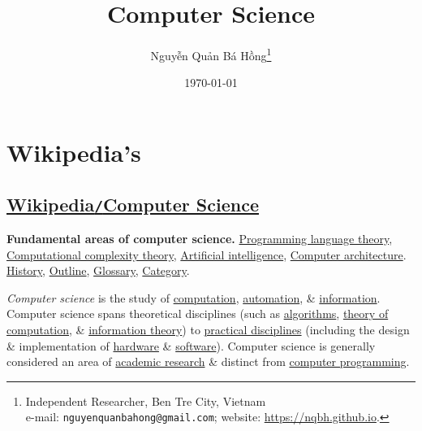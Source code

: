 \documentclass[oneside]{book}
\title{Computer Science}
\author{\selectlanguage{vietnamese} Nguyễn Quản Bá Hồng\footnote{Independent Researcher, Ben Tre City, Vietnam\\e-mail: \texttt{nguyenquanbahong@gmail.com}; website: \url{https://nqbh.github.io}.}}
\date{\today}
\numberwithin{equation}{section}
\begin{document}
\maketitle
\tableofcontents


\chapter{Wikipedia's}

\section{\href{https://en.wikipedia.org/wiki/Computer_science}{Wikipedia\texttt{/}Computer Science}}
\textsf{\textbf{Fundamental areas of computer science.} \href{https://en.wikipedia.org/wiki/Programming_language_theory}{Programming language theory}, \href{https://en.wikipedia.org/wiki/Computational_complexity_theory}{Computational complexity theory}, \href{https://en.wikipedia.org/wiki/Artificial_intelligence}{Artificial intelligence}, \href{https://en.wikipedia.org/wiki/Computer_architecture}{Computer architecture}.} \href{https://en.wikipedia.org/wiki/History_of_computer_science}{History}, \href{https://en.wikipedia.org/wiki/Outline_of_computer_science}{Outline}, \href{https://en.wikipedia.org/wiki/Glossary_of_computer_science}{Glossary}, \href{https://en.wikipedia.org/wiki/Category:Computer_science}{Category}.

\textit{Computer science} is the study of \href{https://en.wikipedia.org/wiki/Computation}{computation}, \href{https://en.wikipedia.org/wiki/Automation}{automation}, \& \href{https://en.wikipedia.org/wiki/Information}{information}. Computer science spans theoretical disciplines (such as \href{https://en.wikipedia.org/wiki/Algorithm}{algorithms}, \href{https://en.wikipedia.org/wiki/Theory_of_computation}{theory of computation}, \& \href{https://en.wikipedia.org/wiki/Information_theory}{information theory}) to \href{https://en.wikipedia.org/wiki/Applied_science}{practical disciplines} (including the design \& implementation of \href{https://en.wikipedia.org/wiki/Computer_architecture}{hardware} \& \href{https://en.wikipedia.org/wiki/Computer_programming}{software}). Computer science is generally considered an area of \href{https://en.wikipedia.org/wiki/Research}{academic research} \& distinct from \href{https://en.wikipedia.org/wiki/Computer_programming}{computer programming}. 
\end{document}
